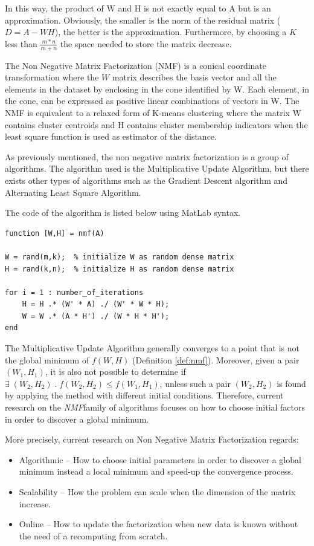 \documentclass[a4paper,12pt]{article}
\newcommand{\nmf}{\textit{NMF}}
\begin{document}
In this way, the product of W and H is not exactly equal to A but is an approximation. 
Obviously, the smaller is the norm of the residual matrix ($D = A - WH$), the better is the approximation. 
Furthermore, by choosing a $K$ less than $\frac{m * n}{m + n} $ the space needed to store the matrix decrease.


The Non Negative Matrix Factorization (NMF) is a conical coordinate transformation \cite{Nikolaus07learningthe} where the $W$ matrix describes the basis vector and all the elements in the dataset by enclosing in the cone identified by W. 
Each element, in the cone, can be expressed as positive linear combinations of vectors in W. 
The NMF is equivalent to a relaxed form of K-means clustering where the matrix W contains cluster centroids and H contains cluster membership indicators when the least square function is used as estimator of the distance.


As previously mentioned, the non negative matrix factorization is a group of algorithms. 
The algorithm used is the Multiplicative Update Algorithm, but there exists other types of algorithms such as the Gradient Descent algorithm\cite{gradient} and Alternating Least Square Algorithm\cite{least}. 

The code of the algorithm is listed below using MatLab syntax.
\begin{lstlisting}[style=matlab,label=code:nmf,caption=Pseudocode of the multiplicative update algorithm. The .* and ./ operators stand for element by element multiplication and division.]
function [W,H] = nmf(A)

W = rand(m,k);	% initialize W as random dense matrix 
H = rand(k,n);	% initialize H as random dense matrix 

for i = 1 : number_of_iterations
	H = H .* (W' * A) ./ (W' * W * H);
	W = W .* (A * H') ./ (W * H * H');
end
\end{lstlisting}

The Multiplicative Update Algorithm generally converges to a point that is not the global minimum of $f(W,H)$ (Definition \ref{def:nmf}).
Moreover, given a pair $(W_1,H_1)$, it is also not possible to determine if $\exists \; (W_2,H_2) \; . \;f(W_2,H_2) \leq f(W_1,H_1)$, unless such a pair $(W_2,H_2)$ is found by applying the method with different initial conditions. 
Therefore, current research on the \nmf  family of algorithms focuses on how to choose initial factors in order to discover a global minimum.

More precisely, current research on Non Negative Matrix Factorization regards:
\begin{itemize}
  \item Algorithmic -- How to choose initial parameters in order to discover a global minimum instead a local minimum and speed-up the convergence process.
   \item Scalability -- How the problem can scale when the dimension of the matrix increase.
    \item Online -- How to update the factorization when new data is known without the need of a recomputing from scratch.
\end{itemize}
\end{document}
